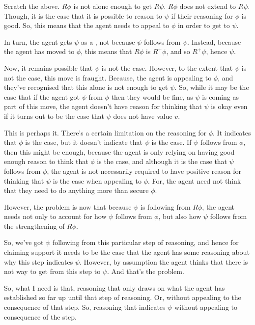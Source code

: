 \begin{note}
  Scratch the above.
  \(R\phi\) is not alone enough to get \(R\psi\).
  \(R\phi\) does not extend to \(R\psi\).
  Though, it is the case that it is possible to reason to \(\psi\) if their reasoning for \(\phi\) is good.
  So, this means that the agent needs to appeal to \(\phi\) in order to get to \(\psi\).

  In turn, the agent gets \(\psi\) as a \requ{}, not because \(\psi\) follows from \(\psi\).
  Instead, because the agent has moved to \(\phi\), this means that \(R\phi\) is \(R^{+}\phi\), and so \(R^{+}\psi\), hence \(\psi\).

  Now, it remains possible that \(\psi\) is not the case.
  However, to the extent that \(\psi\) is not the case, this move is fraught.
  Because, the agent is appealing to \(\phi\), and they've recognised that this alone is not enough to get \(\psi\).
  So, while it may be the case that if the agent got \(\psi\) from \(\phi\) then they would be fine, as \(\psi\) is coming as part of this move, the agent doesn't have reason for thinking that \(\psi\) is okay even if it turns out to be the case that \(\psi\) does not have value \(v\).

  This is perhaps it.
  There's a certain limitation on the reasoning for \(\phi\).
  It indicates that \(\phi\) is the case, but it doesn't indicate that \(\psi\) is the case.
  If \(\psi\) follows from \(\phi\), then this might be enough, because the agent is only relying on having good enough reason to think that \(\phi\) is the case, and although it is the case that \(\psi\) follows from \(\phi\), the agent is not necessarily required to have positive reason for thinking that \(\psi\) is the case when appealing to \(\phi\).
  For, the agent need not think that they need to do anything more than secure \(\phi\).

  However, the problem is now that because \(\psi\) is following from \(R\phi\), the agent needs not only to account for how \(\psi\) follows from \(\phi\), but also how \(\psi\) follows from the strengthening of \(R\phi\).

  So, we've got \(\psi\) following from this particular step of reasoning, and hence for claiming support it needs to be the case that the agent has some reasoning about why this step indicates \(\psi\).
  However, by assumption the agent thinks that there is not way to get from this step to \(\psi\).
  And that's the problem.

  So, what I need is that, reasoning that only draws on what the agent has established so far up until that step of reasoning.
  Or, without appealing to the consequence of that step.
  So, reasoning that indicates \(\psi\) without appealing to consequence of the step.
\end{note}

